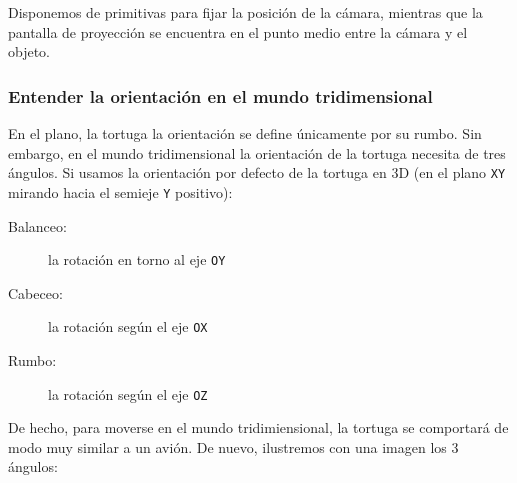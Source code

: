 Disponemos de primitivas para fijar la posici\'on de la c\'amara, mientras
que la pantalla de proyecci\'on se encuentra en el punto medio entre la c\'amara
y el objeto.

\subsubsection{Entender la orientaci\'on en el mundo tridimensional}

En el plano, la tortuga la orientaci\'on se define \'unicamente por su rumbo.
Sin embargo, en el mundo tridimensional la orientaci\'on de la tortuga necesita
de tres \'angulos. Si usamos la orientaci\'on por defecto de la tortuga en 3D
(en el plano \texttt{XY} mirando hacia el semieje \texttt{Y} positivo):
\begin{description}
   \item[Balanceo:] la rotaci\'on en torno al eje \texttt{OY}
   \item[Cabeceo:] la rotaci\'on seg\'un el eje \texttt{OX}
   \item[Rumbo:] la rotaci\'on seg\'un el eje \texttt{OZ}
\end{description}
De hecho, para moverse en el mundo tridimiensional, la tortuga se comportar\'a 
de modo muy similar a un avi\'on. De nuevo, ilustremos con una imagen los 3
\'angulos:
